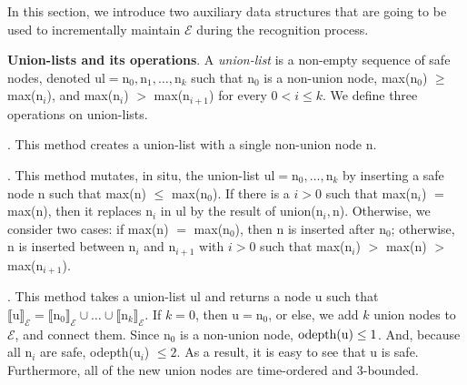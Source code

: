 In this section, we introduce two auxiliary data structures that are going to be used to incrementally maintain $\mathcal{E}$ during the recognition process.

\textbf{Union-lists and its operations}. A \emph{union-list} is a non-empty sequence of safe nodes, denoted $\textrm{ul} = \textrm{n}_{0}, \textrm{n}_{1}, \ldots, \textrm{n}_{k}$ such that $\textrm{n}_{0}$ is a non-union node, max($\textrm{n}_{0}$) $\ge$ max($\textrm{n}_{i}$), and max($\textrm{n}_{i}$) $>$ max($\textrm{n}_{i+1}$) for every $0 < i \le k$. We define three operations on union-lists.

. This method creates a union-list with a single non-union node \textrm{n}.

. This method mutates, in situ, the union-list $\textrm{ul} = \textrm{n}_{0}, \ldots, \textrm{n}_{k}$ by inserting a safe node \textrm{n} such that max($\textrm{n}$) $\le$ max($\textrm{n}_{0}$). If there is a $i > 0$ such that max($\textrm{n}_{i}$) $=$ max($\textrm{n}$), then it replaces $\textrm{n}_{i}$ in \textrm{ul} by the result of union($\textrm{n}_{i}, \textrm{n}$). Otherwise, we consider two cases: if max($\textrm{n}$) $=$ max($\textrm{n}_{0}$), then \textrm{n} is inserted after $\textrm{n}_{0}$; otherwise,  \textrm{n} is inserted between $\textrm{n}_{i}$ and $\textrm{n}_{i+1}$ with $i > 0$ such that max($\textrm{n}_{i}$) $>$ max($\textrm{n}$) $>$ max($\textrm{n}_{i+1}$).

. This method takes a union-list \textrm{ul} and returns a node \textrm{u} such that ${\llbracket \textrm{u} \rrbracket}_{\mathcal{E}} = {\llbracket \textrm{n}_{0} \rrbracket}_{\mathcal{E}} \cup \ldots \cup {\llbracket \textrm{n}_{k} \rrbracket}_{\mathcal{E}} $. If $k = 0$, then $\textrm{u} = \textrm{n}_{0}$, or else, we add $k$ union nodes to $\mathcal{E}$, and connect them. Since $\textrm{n}_{0}$ is a non-union node, $\text{odepth(\textrm{u})} \le 1$. And, because all $\textrm{n}_{i}$ are safe, odepth($\textrm{u}_i$) $\le 2$. As a result, it is easy to see that \textrm{u} is safe. Furthermore, all of the new union nodes are time-ordered and $3$-bounded.


